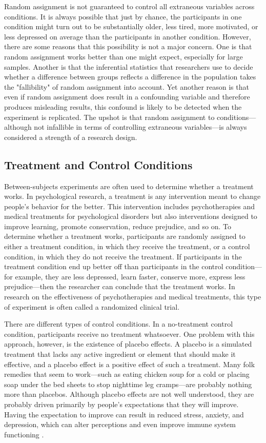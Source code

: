 Random assignment is not guaranteed to control all extraneous variables across conditions. It is always possible that just by chance, the participants in one condition might turn out to be substantially older, less tired, more motivated, or less depressed on average than the participants in another condition. However, there are some reasons that this possibility is not a major concern. One is that random assignment works better than one might expect, especially for large samples. Another is that the inferential statistics that researchers use to decide whether a difference between groups reflects a difference in the population takes the "fallibility" of random assignment into account. Yet another reason is that even if random assignment does result in a confounding variable and therefore produces misleading results, this confound is likely to be detected when the experiment is replicated. The upshot is that random assignment to conditions---although not infallible in terms of controlling extraneous variables---is always considered a strength of a research design.

\subsection{Treatment and Control Conditions}

Between-subjects experiments are often used to determine whether a treatment works. In psychological research, a treatment is any intervention meant to change people's behavior for the better. This intervention includes psychotherapies and medical treatments for psychological disorders but also interventions designed to improve learning, promote conservation, reduce prejudice, and so on. To determine whether a treatment works, participants are randomly assigned to either a treatment condition, in which they receive the treatment, or a control condition, in which they do not receive the treatment. If participants in the treatment condition end up better off than participants in the control condition---for example, they are less depressed, learn faster, conserve more, express less prejudice---then the researcher can conclude that the treatment works. In research on the effectiveness of psychotherapies and medical treatments, this type of experiment is often called a randomized clinical trial.

There are different types of control conditions. In a no-treatment control condition, participants receive no treatment whatsoever. One problem with this approach, however, is the existence of placebo effects. A placebo is a simulated treatment that lacks any active ingredient or element that should make it effective, and a placebo effect is a positive effect of such a treatment. Many folk remedies that seem to work---such as eating chicken soup for a cold or placing soap under the bed sheets to stop nighttime leg cramps---are probably nothing more than placebos. Although placebo effects are not well understood, they are probably driven primarily by people's expectations that they will improve. Having the expectation to improve can result in reduced stress, anxiety, and depression, which can alter perceptions and even improve immune system functioning \citep{price_comprehensive_2008}.


